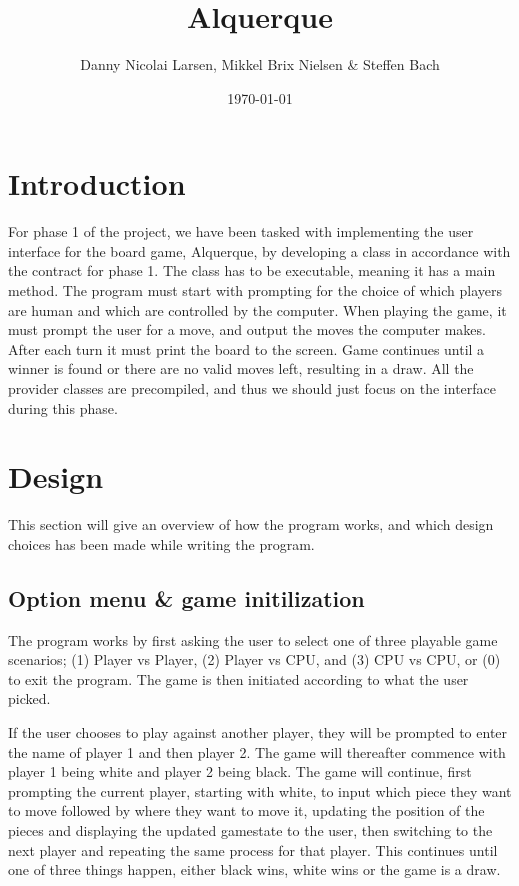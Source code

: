 \documentclass[12pt, a4paper]{article}
\title{Alquerque}
\author{Danny Nicolai Larsen, Mikkel Brix Nielsen \& Steffen Bach}
\date{\today}
\begin{document}
\maketitle
\newpage
\tableofcontents
\newpage
\section{Introduction}
For phase 1 of the project, we have been tasked with implementing the user interface for the board game, Alquerque, by developing a class in accordance with the contract for phase 1. The class has to be executable, meaning it has a main method. The program must start with prompting for the choice of which players are human and which are controlled by the computer. When playing the game, it must prompt the user for a move, and output the moves the computer makes. After each turn it must print the board to the screen. Game continues until a winner is found or there are no valid moves left, resulting in a draw. All the provider classes are precompiled, and thus we should just focus on the interface during this phase.

\section{Design}
\label{design}
This section will give an overview of how the program works, and which design choices has been made while writing the program.

\subsection{Option menu \& game initilization}
The program works by first asking the user to select one of three playable game scenarios; (1) Player vs Player, (2) Player vs CPU, and (3) CPU vs CPU, or (0) to exit the program. The game is then initiated according to what the user picked.

If the user chooses to play against another player, they will be prompted to enter the name of player 1 and then player 2. The game will thereafter commence with player 1 being white and player 2 being black. The game will continue, first prompting the current player, starting with white, to input which piece they want to move followed by where they want to move it, updating the position of the pieces and displaying the updated gamestate to the user, then switching to the next player and repeating the same process for that player. This continues until one of three things happen, either black wins, white wins or the game is a draw. 
\end{document}
